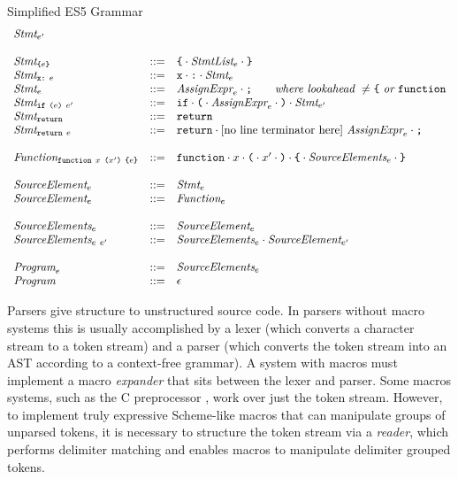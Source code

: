 \documentclass[preprint,10pt]{sigplanconf}
\begin{document}
\begin{displayfigure*}{\label{fig:grammar}Simplified ES5 Grammar}
\[\begin{array}{lcl}
  \textit{Stmt}_{e'}
  \\ \\
  \textit{Stmt}_{\texttt{\{} e \texttt{\}}} &::=& 
  \texttt{\{} \cdot \textit{StmtList}_{e}\cdot \texttt{\}}
  \\
  \textit{Stmt}_{\texttt{x}\texttt{:}~e} &::=&
  \texttt{x}\cdot \texttt{:}\cdot\textit{Stmt}_{e}
  \\
  \textit{Stmt}_{e} &::=& 
  \textit{AssignExpr}_{e} \cdot \texttt{;}
  \qquad \textit{where lookahead}~\not = 
    \texttt{\{}~\textit{or}~\texttt{function}
  \\
  \textit{Stmt}_{\texttt{if}~\texttt{(}e \texttt{)}~e'} &::=& 
  \texttt{if}\cdot 
  \texttt{(}\cdot \textit{AssignExpr}_{e} \cdot \texttt{)}\cdot \textit{Stmt}_{e'}
  \\
  \textit{Stmt}_{\texttt{return}} &::=& 
  \texttt{return}
  \\
  \textit{Stmt}_{\texttt{return}~e} &::=& 
  \texttt{return}\cdot \textrm{[no line terminator
    here]}~\textit{AssignExpr}_{e}\cdot \texttt{;}
  \\ \\
  \textit{Function}_{\texttt{function}~x~ \texttt{(}x' \texttt{)}~\texttt{\{}e \texttt{\}}} 
  &::=&
  \texttt{function} \cdot x \cdot 
  \texttt{(} \cdot x' \cdot \texttt{)}\cdot
  \texttt{\{}\cdot \textit{SourceElements}_{e} \cdot \texttt{\}}
  \\ \\
  \textit{SourceElement}_{e} &::=& \textit{Stmt}_{e} 
  \\
  \textit{SourceElement}_{e} &::=& \textit{Function}_{e}
  \\ \\

  \textit{SourceElements}_{e} &::=& \textit{SourceElement}_{e}
  \\
  \textit{SourceElements}_{e~e'} &::=&
  \textit{SourceElements}_{e}\cdot \textit{SourceElement}_{e'}
  \\ \\
  \textit{Program}_{e} &::=& \textit{SourceElements}_{e}
  \\
  \textit{Program}_{} &::=& \epsilon
\end{array}
\]  
\end{displayfigure*}

Parsers give structure to unstructured source code. In parsers without
macro systems this is usually accomplished by a lexer (which converts
a character stream to a token stream) and a parser (which converts the
token stream into an AST according to a context-free grammar). A
system with macros must implement a macro \emph{expander} that sits
between the lexer and parser. Some macros systems, such as the C
preprocessor \cite{Harbison1984}, work over just the token stream.
However, to implement truly
expressive Scheme-like macros that can manipulate groups of unparsed
tokens, it is necessary to structure the token stream via a
\emph{reader}, which performs delimiter matching and enables macros to manipulate delimiter grouped tokens.
\end{document}
